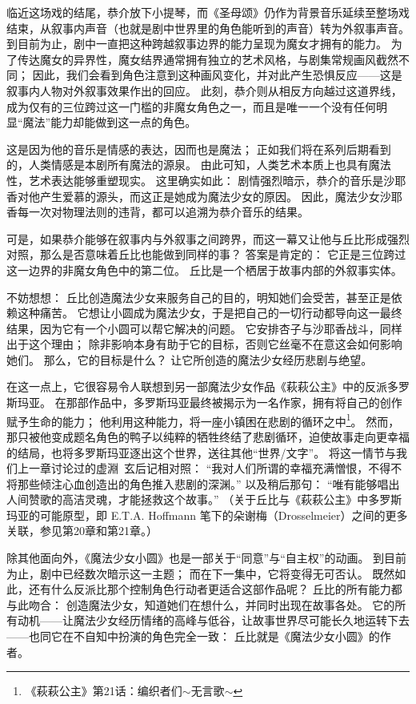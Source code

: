 临近这场戏的结尾，恭介放下小提琴，而《圣母颂》仍作为背景音乐延续至整场戏结束，从叙事内声音（也就是剧中世界里的角色能听到的声音）转为外叙事声音。
到目前为止，剧中一直把这种跨越叙事边界的能力呈现为魔女才拥有的能力。
为了传达魔女的异界性，魔女结界通常拥有独立的艺术风格，与剧集常规画风截然不同；
因此，我们会看到角色注意到这种画风变化，并对此产生恐惧反应——这是叙事内人物对外叙事效果作出的回应。
此刻，恭介则从相反方向越过这道界线，成为仅有的三位跨过这一门槛的非魔女角色之一，而且是唯一一个没有任何明显“魔法”能力却能做到这一点的角色。

这是因为他的音乐是情感的表达，因而也是魔法；
正如我们将在系列后期看到的，人类情感是本剧所有魔法的源泉。
由此可知，人类艺术本质上也具有魔法性，艺术表达能够重塑现实。
这里确实如此：
剧情强烈暗示，恭介的音乐是沙耶香对他产生爱慕的源头，而这正是她成为魔法少女的原因。
因此，魔法少女沙耶香每一次对物理法则的违背，都可以追溯为恭介音乐的结果。

可是，如果恭介能够在叙事内与外叙事之间跨界，而这一幕又让他与丘比形成强烈对照，那么是否意味着丘比也能做到同样的事？
答案是肯定的：
它正是三位跨过这一边界的非魔女角色中的第二位。
丘比是一个栖居于故事内部的外叙事实体。

不妨想想：
丘比创造魔法少女来服务自己的目的，明知她们会受苦，甚至正是依赖这种痛苦。
它想让小圆成为魔法少女，于是把自己的一切行动都导向这一最终结果，因为它有一个小圆可以帮它解决的问题。
它安排杏子与沙耶香战斗，同样出于这个理由；
除非影响本身有助于它的目标，否则它丝毫不在意这会如何影响她们。
那么，它的目标是什么？
让它所创造的魔法少女经历悲剧与绝望。

在这一点上，它很容易令人联想到另一部魔法少女作品《萩萩公主》中的反派多罗斯玛亚\cite{ref33}。
在那部作品中，多罗斯玛亚最终被揭示为一名作家，拥有将自己的创作赋予生命的能力；
他利用这种能力，将一座小镇困在悲剧的循环之中\footnote{%
    《萩萩公主》第21话：编织者们$\sim$无言歌$\sim$
}。
然而，那只被他变成题名角色的鸭子以纯粹的牺牲终结了悲剧循环，迫使故事走向更幸福的结局，也将多罗斯玛亚逐出这个世界，送往其他“世界/文字”。
将这一情节与我们上一章讨论过的虚淵\, 玄后记相对照：
“我对人们所谓的幸福充满憎恨，不得不将那些倾注心血创造出的角色推入悲剧的深渊。”
以及稍后那句：
“唯有能够唱出人间赞歌的高洁灵魂，才能拯救这个故事。”
\cite{ref29}（关于丘比与《萩萩公主》中多罗斯玛亚的可能原型，即 E.T.A. Hoffmann 笔下的朵谢梅（Drosselmeier）之间的更多关联，参见第20章和第21章。）

除其他面向外，《魔法少女小圆》也是一部关于“同意”与“自主权”的动画。
到目前为止，剧中已经数次暗示这一主题；
而在下一集中，它将变得无可否认。
既然如此，还有什么反派比那个控制角色行动者更适合这部作品呢？
丘比的所有能力都与此吻合：
创造魔法少女，知道她们在想什么，并同时出现在故事各处。
它的所有动机——让魔法少女经历情绪的高峰与低谷，让故事世界尽可能长久地运转下去——也同它在不自知中扮演的角色完全一致：
丘比就是《魔法少女小圆》的作者。
